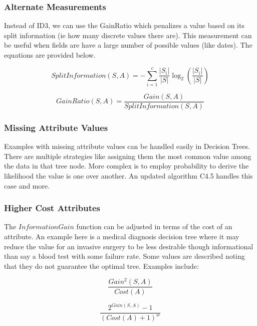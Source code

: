 \documentclass[11pt]{article}
\begin{document}
\subsubsection*{Alternate Measurements}

Instead of ID3, we can use the GainRatio which penalizes a value based on its split information (ie how many discrete values there are). This measurement can be useful when fields are have a large number of possible values (like dates). The equations are provided below.

\begin{equation}
SplitInformation(S,A) = -\sum_{i=1}^{c} \frac{|S_i|}{|S|} \log_2(\frac{|S_i|}{|S|})
\end{equation}

\begin{equation}
GainRatio(S,A) = \frac{Gain(S, A)}{SplitInformation(S, A)}
\end{equation}

\subsubsection*{Missing Attribute Values}

Examples with missing attribute values can be handled easily in Decision Trees. There are multiple strategies like assigning them the most common value among the data in that tree node. More complex is to employ probability to derive the likelihood the value is one over another. An updated algorithm C4.5 handles this case and more.

\subsubsection*{Higher Cost Attributes}

The $InformationGain$ function can be adjusted in terms of the cost of an attribute. An example here is a medical diagnosis decision tree where it may reduce the value for an invasive surgery to be less desirable though informational than say a blood test with some failure rate. Some values are described noting that they do not guarantee the optimal tree. Examples include:

\begin{equation}
\frac{Gain^2(S, A)}{Cost(A)}
\end{equation}

\begin{equation}
\frac{2^{Gain(S, A)} - 1}{(Cost(A) + 1)^w}
\end{equation}
\end{document}
